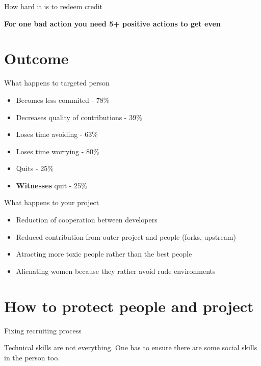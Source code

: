 \documentclass{beamer}
\begin{document}
\begin{frame}{How hard it is to redeem credit}
	\begin{center}
	\textbf{For one bad action you need 5+ positive actions to get even}
	\end{center}
\end{frame}

\section{Outcome}

\begin{frame}[t]{What happens to targeted person}
	\begin{itemize}
	\item Becomes less commited - 78\%
	\item Decreases quality of contributions - 39\%
	\item Loses time avoiding - 63\%
	\item Loses time worrying - 80\%
	\item Quits - 25\%
	\item \textbf{Witnesses} quit - 25\%
	\end{itemize}
\end{frame}

\begin{frame}[t]{What happens to your project}
	\begin{itemize}
	\item Reduction of cooperation between developers
	\item Reduced contribution from outer project and people (forks, upstream)
	\item Atracting more toxic people rather than the best people
	\item Alienating women because they rather avoid rude environments
	\end{itemize}
\end{frame}

\section{How to protect people and project}

\begin{frame}{Fixing recruiting process}
	\begin{center}
	Technical skills are not everything. One has to ensure there are some social skills in the person too.
	\end{center}
\end{frame}
\end{document}
